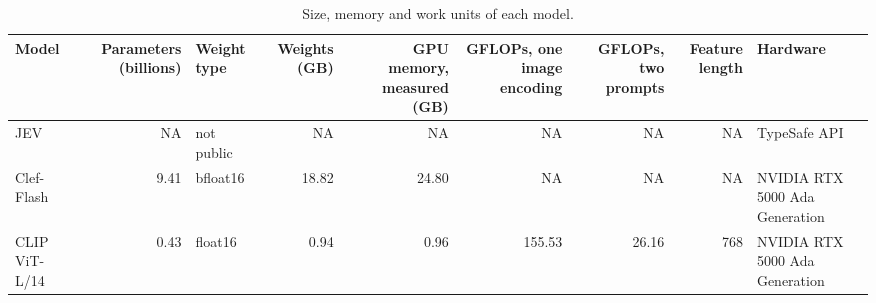 \begin{table}

\caption{\label{tab:tbl-compute-size}Size, memory and work units of each model.}
\centering
\begin{tabular}[t]{lrlrrrrrl}
\toprule
Model & Parameters (billions) & Weight type & Weights (GB) & GPU memory, measured (GB) & GFLOPs, one image encoding & GFLOPs, two prompts & Feature length & Hardware\\
\midrule
JEV & NA & not public & NA & NA & NA & NA & NA & TypeSafe API\\
Clef-Flash & 9.41 & bfloat16 & 18.82 & 24.80 & NA & NA & NA & NVIDIA RTX 5000 Ada Generation\\
CLIP ViT-L/14 & 0.43 & float16 & 0.94 & 0.96 & 155.53 & 26.16 & 768 & NVIDIA RTX 5000 Ada Generation\\
\bottomrule
\end{tabular}
\end{table}

